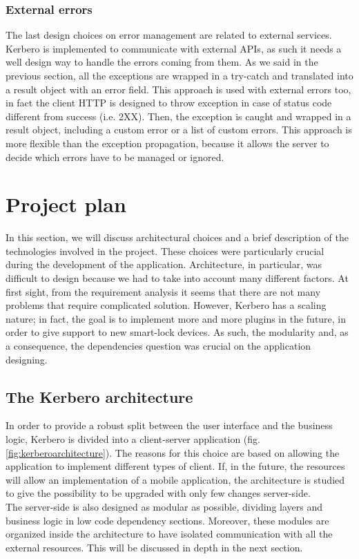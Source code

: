 \subsubsection{External errors}
The last design choices on error management are related to external services. Kerbero is implemented to communicate with external APIs, as such it needs a well design way to handle the errors coming from them. As we said in the previous section, all the exceptions are wrapped in a try-catch and translated into a result object with an error field. This approach is used with external errors too, in fact the client HTTP is designed to throw exception in case of status code different from success (i.e. 2XX). Then, the exception is caught and wrapped in a result object, including a custom error or a list of custom errors. This approach is more flexible than the exception propagation, because it allows the server to decide which errors have to be managed or ignored.

\section{Project plan}
In this section, we will discuss architectural choices and a brief description of the technologies involved in the project. These choices were particularly crucial during the development of the application. Architecture, in particular, was difficult to design because we had to take into account many different factors. At first sight, from the requirement analysis it seems that there are not many problems that require complicated solution. However, Kerbero has a scaling nature; in fact, the goal is to implement more and more plugins in the future, in order to give support to new smart-lock devices. As such, the modularity and, as a consequence, the dependencies question was crucial on the application designing. 

\subsection{The Kerbero architecture}
\label{sec:architecture}
In order to provide a robust split between the user interface and the business logic, Kerbero is divided into a client-server application (fig. \ref{fig:kerberoarchitecture}). The reasons for this choice are based on allowing the application to implement different types of client. If, in the future, the resources will allow an implementation of a mobile application, the architecture is studied to give the possibility to be upgraded with only few changes server-side.
\\ The server-side is also designed as modular as possible, dividing layers and business logic in low code dependency sections. Moreover, these modules are organized inside the architecture to have isolated communication with all the external resources. This will be discussed in depth in the next section. 

